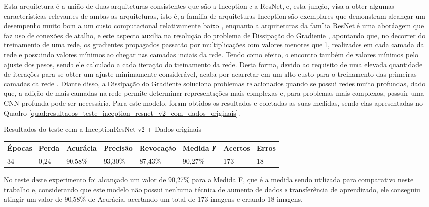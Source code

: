 \documentclass[
	12pt,				%
	oneside,			%
	a4paper,			%
	english,			%
	brazil				%
	]{abntex2ppgsi}
\begin{document}
Esta arquitetura é a união de duas arquiteturas consistentes que são a Inception e a ResNet, e, esta junção, visa a obter algumas características relevantes de ambas as arquiteturas, isto é, a família de arquiteturas Inception são exemplares que demonstram alcançar um desempenho muito bom a um custo computacional relativamente baixo \cite{szegedy2017inception}, enquanto a arquiteturas da família ResNet é uma abordagem que faz uso de conexões de atalho, e este aspecto auxilia na resolução do problema de Dissipação do Gradiente \cite{feng2017overview}, apontando que, no decorrer do treinamento de uma rede, os gradientes propagados passarão por multiplicações com valores menores que 1, realizados em cada camada da rede e possuindo valores mínimos ao chegar nas camadas inciais da rede. Tendo como efeito, o encontro também de valores mínimos pelo ajuste dos pesos, sendo ele calculado a cada iteração do treinamento da rede. Desta forma, devido ao requisito de uma elevada quantidade de iterações para se obter um ajuste minimamente considerável, acaba por acarretar em um alto custo para o treinamento das primeiras camadas da rede \cite{hochreiter1998vanishing}. Diante disso, a Dissipação do Gradiente soluciona problemas relacionados quando se possui redes muito profundas, dado que, a adição de mais camadas na rede permite determinar representações mais complexas e, para problemas mais complexos, possuir uma CNN profunda pode ser necessário. Para este modelo, foram obtidos os resultados e coletadas as suas medidas, sendo elas apresentadas no Quadro \ref{quad:resultados_teste_inception_resnet_v2_com_dados_originais}.

\begin{quadro}[H]
\caption{Resultados do teste com a InceptionResNet v2 + Dados originais}
\label{quad:resultados_teste_inception_resnet_v2_com_dados_originais}
\centering
\begin{tabular}{|l|l|l|l|l|l|l|l|}
\cline{1-8}
Épocas & Perda & Acurácia & Precisão & Revocação & Medida F & Acertos & Erros \\ \hline
34 & 0,24 & 90,58\% & 93,30\% & 87,43\% & 90,27\% & 173 & 18 \\
\cline{1-8}
\end{tabular}
\end{quadro}

No teste deste experimento foi alcançado um valor de 90,27\% para a Medida F, que é a medida sendo utilizada para comparativo neste trabalho e, considerando que este modelo não possui nenhuma técnica de aumento de dados e transferência de aprendizado, ele conseguiu atingir um valor de 90,58\% de Acurácia, acertando um total de 173 imagens e errando 18 imagens.
\end{document}
